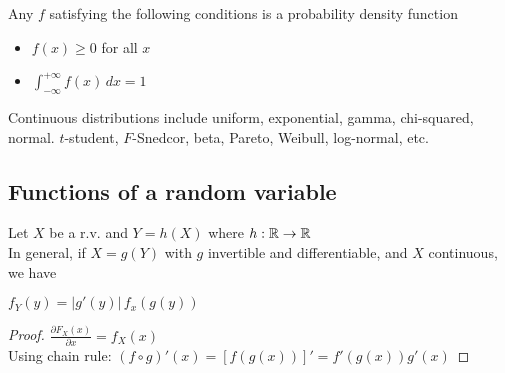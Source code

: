 Any $f$ satisfying the following conditions is a probability density function
\begin{itemize}
    \item $f(x)\geq 0$ for all $x$
    \item $\int_{-\infty}^{+\infty}f(x)\, dx =1$
\end{itemize}
Continuous distributions include uniform, exponential, gamma, chi-squared, normal. $t$-student, $F$-Snedcor, beta, Pareto, Weibull, log-normal, etc.

\subsection{Functions of a random variable}
Let $X$ be a r.v. and $Y=h(X)$ where $h:\mathbb{R}\to\mathbb{R}$\\
In general, if $X=g(Y)$ with $g$ invertible and differentiable, and $X$ continuous, we have
    \begin{center}
        $f_Y(y) = |g'(y)|\, f_x(g(y))$
    \end{center}
\begin{proof}
    $\displaystyle\frac{\partial F_X(x)}{\partial x}=f_X(x)$\\
    Using chain rule: $(f\circ g)'(x) = [f(g(x))]' = f'(g(x))g'(x)$
\end{proof}

